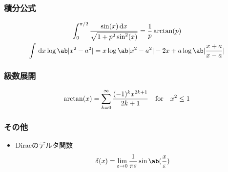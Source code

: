 \subsubsection{積分公式}
\begin{gather}%
  \label{eq:3.676}
  \int_0^{\pi/2} \frac{\sin(x) \dl{x}}{\sqrt{1+p^2\sin^2(x)}} 
  = \frac{1}{p}\arctan(p)\\
  \label{eq:2.736}
  \int \dl{x} \log \ab|x^2 - a^2|  = x \log\ab|x^2-a^2| - 2x + a \log \ab|\frac{x+a}{x-a}|\\
\end{gather}

\subsubsection{級数展開}
\begin{gather}%
  \label{eq:1.643}
  \arctan(x) = \sum_{k=0}^\infty \frac{(-1)^k x^{2k+1}}{2k+1} \qqtext{for} x^2 \leq 1
\end{gather}%

\subsubsection{その他}
\begin{itemize}%
  \item Diracのデルタ関数
    \begin{gather}%
      \delta(x) = \lim_{\eps \to 0} \frac{1}{\pi \eps}\sin\ab(\frac{x}{\eps})
    \end{gather}%
\end{itemize}%
